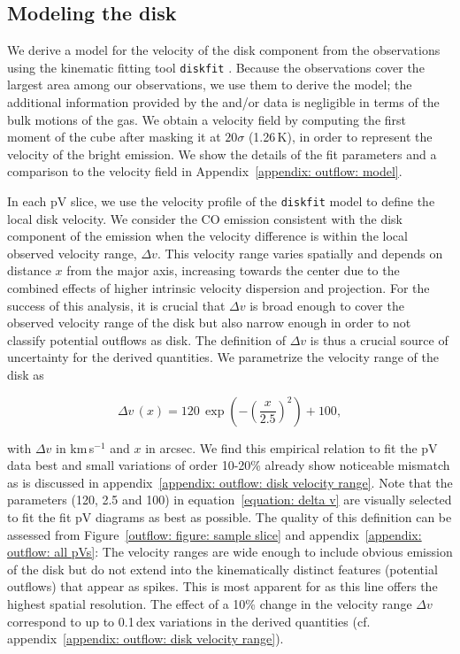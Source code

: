 \subsection{Modeling the disk}

We derive a model for the velocity of the disk component from the  observations using the kinematic fitting tool \texttt{diskfit} \citep{2007ApJ...664..204S,2010MNRAS.404.1733S,2015arXiv150907120S}. Because the  observations cover the largest area among our observations, we use them to derive the model; the additional information provided by the  and/or  data is negligible in terms of the bulk motions of the gas. We obtain a  velocity field by computing the first moment of the cube after masking it at $20\sigma$ (1.26\,K), in order to represent the velocity of the bright emission.
We show the details of the fit parameters and a comparison to the  velocity field in Appendix~\ref{appendix: outflow: model}.

In each pV slice, we use the velocity profile of the \texttt{diskfit} model to define the local disk velocity. We consider the CO emission consistent with the disk component of the emission when the velocity difference is within the local observed velocity range, $\Delta v$. This velocity range varies spatially and depends on distance $x$ from the major axis, increasing towards the center due to the combined effects of higher intrinsic velocity dispersion and projection.
For the success of this analysis, it is crucial that $\Delta v$ is broad enough to cover the observed velocity range of the disk but also narrow enough in order to not classify potential outflows as disk. The definition of $\Delta v$ is thus a crucial source of uncertainty for the derived quantities. We parametrize the velocity range of the disk as

\begin{equation}
	\Delta v\,(x) = 120\,\exp \left( - \left(\frac{x}{2.5}\right)^2 \right) + 100,
	\label{equation: delta v}
\end{equation}

\noindent with $\Delta v$ in km\,s$^{-1}$ and $x$ in arcsec. We find this empirical relation to fit the pV data best and small variations of order 10-20\% already show noticeable mismatch as is discussed in appendix~\ref{appendix: outflow: disk velocity range}. Note that the parameters (120, 2.5 and 100) in equation~\ref{equation: delta v} are visually selected to fit the fit pV diagrams as best as possible. The quality of this definition can be assessed from Figure~\ref{outflow: figure: sample slice} and appendix~\ref{appendix: outflow: all pVs}: The velocity ranges are wide enough to include obvious emission of the disk but do not extend into the kinematically distinct features (potential outflows) that appear as spikes. This is most apparent for  as this line offers the highest spatial resolution. The effect of a 10\% change in the velocity range $\Delta v$ correspond to up to 0.1\,dex variations in the derived quantities (cf. appendix~\ref{appendix: outflow: disk velocity range}).

